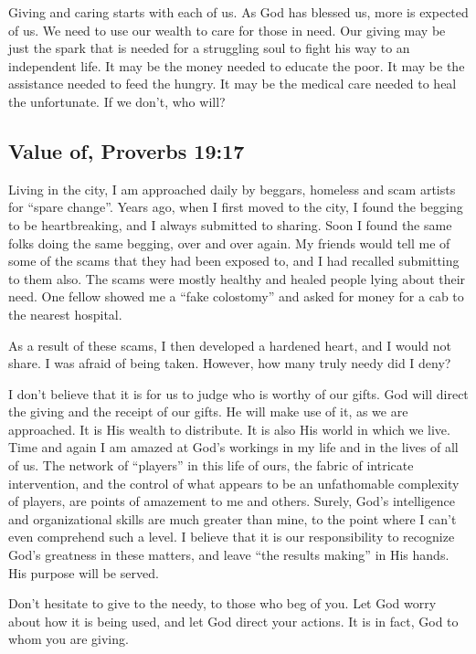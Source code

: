 \documentclass[12pt]{memoir}
\begin{document}
Giving and caring starts with each of us. As God has blessed us, more
is expected of us. We need to use our wealth to care for those in
need. Our giving may be just the spark that is needed for a struggling
soul to fight his way to an independent life. It may be the money
needed to educate the poor. It may be the assistance needed to feed
the hungry. It may be the medical care needed to heal the unfortunate.
If we don't, who will?

\subsection{Value of, Proverbs 19:17}

Living in the city, I am approached daily by beggars, homeless and
scam artists for ``spare change''. Years ago, when I first moved
to the city, I found the begging to be heartbreaking, and I always
submitted to sharing. Soon I found the same folks doing the same begging,
over and over again. My friends would tell me of some of the scams
that they had been exposed to, and I had recalled submitting to them
also. The scams were mostly healthy and healed people lying about
their need. One fellow showed me a ``fake colostomy'' and asked
for money for a cab to the nearest hospital. 

As a result of these scams, I then developed a hardened heart, and
I would not share. I was afraid of being taken. However, how many
truly needy did I deny?

I don't believe that it is for us to judge who is worthy of our gifts.
God will direct the giving and the receipt of our gifts. He will make
use of it, as we are approached. It is His wealth to distribute. It
is also His world in which we live. Time and again I am amazed at
God's workings in my life and in the lives of all of us. The network
of ``players'' in this life of ours, the fabric of intricate intervention,
and the control of what appears to be an unfathomable complexity of
players, are points of amazement to me and others. Surely, God's intelligence
and organizational skills are much greater than mine, to the point
where I can't even comprehend such a level. I believe that it is our
responsibility to recognize God's greatness in these matters, and
leave ``the results making'' in His hands. His purpose will be served. 

Don't hesitate to give to the needy, to those who beg of you. Let
God worry about how it is being used, and let God direct your actions.
It is in fact, God to whom you are giving.
\end{document}
